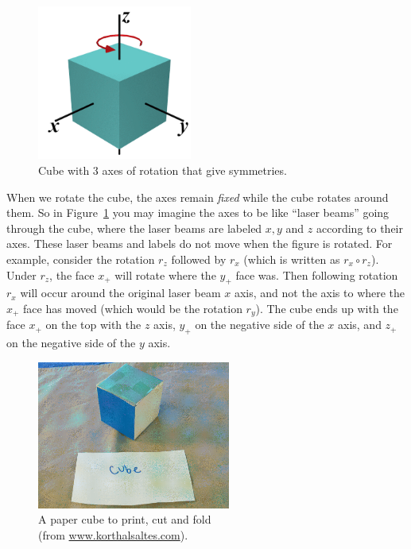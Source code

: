 \begin{figure}[ht]
\begin{center}
\includegraphics[width=2in]{images/AxesOfCube.png}
\caption{Cube with 3 axes of rotation that give symmetries.}\label{fig:CubeRot}
\end{center}
\end{figure}

\begin{rem} When we rotate the cube, the axes remain \emph{fixed} while the cube rotates around them.  So in Figure~\ref{fig:CubeRot} you may imagine the axes to be like ``laser beams'' going through the cube, where the laser beams are labeled $x, y$ and $z$ according to their axes. These laser beams and labels do not move when the figure is rotated. For example, consider the rotation $r_z$ followed by $r_x$ (which is written as $r_x\circ r_z$). Under $r_z$, the face $x_+$ will rotate where the $y_+$ face was. Then following rotation $r_x$ will occur around the original laser beam $x$ axis, and not the axis to where the $x_+$ face has moved (which would be the rotation $r_y$). The cube ends up with the face $x_+$ on the top with the $z$ axis, $y_+$ on the negative side of the $x$ axis, and $z_+$ on the negative side of the $y$ axis.
\end{rem}

\begin{figure}[ht]
\begin{center}
\includegraphics[width=2.5in]{images/CubeFold.png}
\caption[caption]{A paper cube to print, cut and fold 
\\ \hspace{\textwidth} 
(from \url{www.korthalsaltes.com}).}
 \label{fig:CubeFold}
\end{center}
\end{figure}

